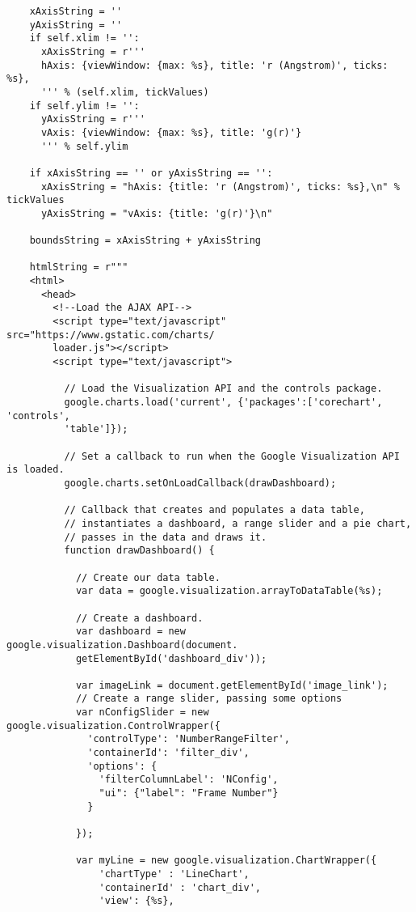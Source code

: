 \begin{verbatim}
    xAxisString = ''
    yAxisString = ''
    if self.xlim != '':
      xAxisString = r'''
      hAxis: {viewWindow: {max: %s}, title: 'r (Angstrom)', ticks: %s},
      ''' % (self.xlim, tickValues)
    if self.ylim != '':
      yAxisString = r'''
      vAxis: {viewWindow: {max: %s}, title: 'g(r)'}
      ''' % self.ylim
  
    if xAxisString == '' or yAxisString == '':
      xAxisString = "hAxis: {title: 'r (Angstrom)', ticks: %s},\n" % tickValues
      yAxisString = "vAxis: {title: 'g(r)'}\n" 

    boundsString = xAxisString + yAxisString

    htmlString = r"""
    <html>
      <head>
        <!--Load the AJAX API-->
        <script type="text/javascript" src="https://www.gstatic.com/charts/
        loader.js"></script>
        <script type="text/javascript">

          // Load the Visualization API and the controls package.
          google.charts.load('current', {'packages':['corechart', 'controls', 
          'table']});

          // Set a callback to run when the Google Visualization API is loaded.
          google.charts.setOnLoadCallback(drawDashboard);

          // Callback that creates and populates a data table,
          // instantiates a dashboard, a range slider and a pie chart,
          // passes in the data and draws it.
          function drawDashboard() {

            // Create our data table.
            var data = google.visualization.arrayToDataTable(%s);

            // Create a dashboard.
            var dashboard = new google.visualization.Dashboard(document.
            getElementById('dashboard_div'));

            var imageLink = document.getElementById('image_link');
            // Create a range slider, passing some options
            var nConfigSlider = new google.visualization.ControlWrapper({
              'controlType': 'NumberRangeFilter',
              'containerId': 'filter_div',
              'options': {
                'filterColumnLabel': 'NConfig',
                "ui": {"label": "Frame Number"}
              }
             
            });
            
            var myLine = new google.visualization.ChartWrapper({
                'chartType' : 'LineChart',
                'containerId' : 'chart_div',
                'view': {%s},


\end{verbatim}
